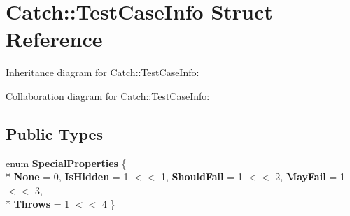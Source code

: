 \hypertarget{struct_catch_1_1_test_case_info}{}\section{Catch\+:\+:Test\+Case\+Info Struct Reference}
\label{struct_catch_1_1_test_case_info}


Inheritance diagram for Catch\+:\+:Test\+Case\+Info\+:


Collaboration diagram for Catch\+:\+:Test\+Case\+Info\+:
\subsection*{Public Types}
\begin{DoxyCompactItemize}
\item 
\hypertarget{struct_catch_1_1_test_case_info_a39b232f74b4a7a6f2183b96759027eac}{}enum {\bfseries Special\+Properties} \{ \\*
{\bfseries None} = 0, 
{\bfseries Is\+Hidden} = 1 $<$$<$ 1, 
{\bfseries Should\+Fail} = 1 $<$$<$ 2, 
{\bfseries May\+Fail} = 1 $<$$<$ 3, 
\\*
{\bfseries Throws} = 1 $<$$<$ 4
 \}\label{struct_catch_1_1_test_case_info_a39b232f74b4a7a6f2183b96759027eac}

\end{DoxyCompactItemize}
